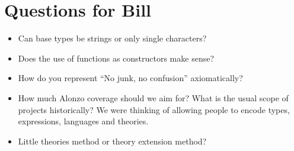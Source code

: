 \documentclass{article}
\begin{document}

\newpage
\section {Questions for Bill}
\begin{itemize}
\item Can base types be strings or only single characters?
\item Does the use of functions as constructors make sense? 
\item How do you represent ``No junk, no confusion'' axiomatically?
\item How much Alonzo coverage should we aim for? What is the usual scope of projects historically? We were thinking of allowing people to encode types, expressions, languages and theories.
\item Little theories method or theory extension method?

\end{itemize}
\end{document}
